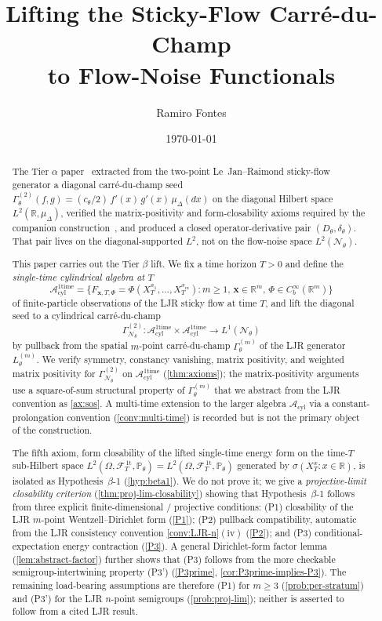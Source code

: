 \documentclass[11pt,reqno]{amsart}
\title{Lifting the Sticky-Flow Carr\'e-du-Champ\\
       to Flow-Noise Functionals}
\author{Ramiro Fontes}
\date{\today}
\theoremstyle{plain}
\theoremstyle{definition}
\theoremstyle{remark}
\newcommand{\R}{\mathbb R}
\newcommand{\Prob}{\mathbb P}
\newcommand{\cA}{\mathcal A}
\newcommand{\cF}{\mathcal F}
\newcommand{\cN}{\mathcal N}
\newcommand{\Acyl}{\cA_{\mathrm{cyl}}}
\newcommand{\Aone}{\cA_{\mathrm{cyl}}^{\mathrm{1time}}}
\newcommand{\FT}{\cF_{T}^{\,\mathrm{1t}}}
\newcommand{\Hone}{L^{2}(\Omega,\FT,\Pth)}
\newcommand{\GamN}{\Gamma^{(2)}_{\cN_{\theta}}}
\newcommand{\GamT}{\Gamma^{(2)}_{\theta}}
\newcommand{\GamM}[1]{\Gamma^{(#1)}_{\theta}}
\newcommand{\Lth}[1]{L^{(#1)}_{\theta}}
\newcommand{\Dth}{D_{\theta}}
\newcommand{\divth}{\delta_{\theta}}
\newcommand{\Pth}{\Prob_{\theta}}
\begin{document}
\begin{abstract}
The Tier $\alpha$ paper~\cite{StickyFlowGammaSeed} extracted from the
two-point Le~Jan--Raimond sticky-flow generator a diagonal
carr\'e-du-champ seed
$\GamT(f,g)=(c_{\theta}/2)\,f'(x)\,g'(x)\,\mu_{\Delta}(dx)$ on the
diagonal Hilbert space $L^{2}(\R,\mu_{\Delta})$, verified the
matrix-positivity and form-closability axioms required by the
companion construction~\cite{GammaHierarchyDivergence}, and produced
a closed operator-derivative pair $(\Dth,\divth)$. That pair lives
on the diagonal-supported $L^{2}$, not on the flow-noise space
$L^{2}(\cN_{\theta})$.

This paper carries out the Tier $\beta$ lift. We fix a time horizon
$T>0$ and define the \emph{single-time cylindrical algebra at $T$}
\[
  \Aone
  =\bigl\{F_{\mathbf x,T,\Phi}=\Phi(X_{T}^{x_{1}},\ldots,X_{T}^{x_{m}}):
       m\ge 1,\,\mathbf x\in\R^{m},\,\Phi\in C_{b}^{\infty}(\R^{m})\bigr\}
\]
of finite-particle observations of the LJR sticky flow at time $T$,
and lift the diagonal seed to a cylindrical carr\'e-du-champ
\[
  \GamN\colon\Aone\times\Aone\longrightarrow L^{1}(\cN_{\theta})
\]
by pullback from the spatial $m$-point carr\'e-du-champ $\GamM{m}$
of the LJR generator $\Lth{m}$. We verify symmetry, constancy
vanishing, matrix positivity, and weighted matrix positivity for
$\GamN$ on $\Aone$ (\cref{thm:axioms}); the matrix-positivity
arguments use a square-of-sum structural property of $\GamM{m}$
that we abstract from the LJR convention as \cref{ax:sos}. A
multi-time extension to the larger algebra $\Acyl$ via a
constant-prolongation convention (\cref{conv:multi-time}) is
recorded but is not the primary object of the construction.

The fifth axiom, form closability of the lifted single-time energy
form on the time-$T$ sub-Hilbert space
$\Hone=L^{2}(\Omega,\FT,\Pth)$ generated by
$\sigma(X_{T}^{x}:x\in\R)$, is isolated as Hypothesis~$\beta$-1
(\cref{hyp:beta1}). We do not prove it; we give a
\emph{projective-limit closability criterion}
(\cref{thm:proj-lim-closability}) showing that
Hypothesis~$\beta$-1 follows from three explicit
finite-dimensional / projective conditions:
{\normalfont (P1)} closability of the LJR $m$-point
Wentzell--Dirichlet form (\cref{P1}); {\normalfont (P2)} pullback
compatibility, automatic from the LJR consistency convention
\cref{conv:LJR-n}$(\mathrm{iv})$ (\cref{P2}); and {\normalfont (P3)}
conditional-expectation energy contraction (\cref{P3}). A general
Dirichlet-form factor lemma (\cref{lem:abstract-factor}) further
shows that {\normalfont (P3)} follows from the more checkable
semigroup-intertwining property {\normalfont (P3')}
(\cref{P3prime}, \cref{cor:P3prime-implies-P3}). The remaining
load-bearing assumptions are therefore {\normalfont (P1)} for
$m\ge 3$ (\cref{prob:per-stratum}) and {\normalfont (P3')} for the
LJR $n$-point semigroups (\cref{prob:proj-lim}); neither is
asserted to follow from a cited LJR result.


\end{abstract}
\end{document}
